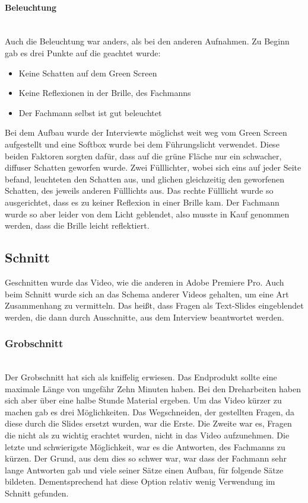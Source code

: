 \paragraph{Beleuchtung}
\leavevmode \\
Auch die Beleuchtung war anders, als bei den anderen Aufnahmen. Zu Beginn gab es drei Punkte auf die geachtet wurde:
\begin{itemize}
\item Keine Schatten auf dem Green Screen
\item Keine Reflexionen in der Brille, des Fachmanns
\item Der Fachmann selbst ist gut beleuchtet 
\end{itemize}
Bei dem Aufbau wurde der Interviewte möglichst weit weg vom Green Screen aufgestellt und eine Softbox wurde bei dem Führungslicht verwendet. Diese beiden Faktoren sorgten dafür, dass auf die grüne Fläche nur ein schwacher, diffuser Schatten geworfen wurde. Zwei Fülllichter, wobei sich eins auf jeder Seite befand, leuchteten den Schatten aus, und glichen gleichzeitig den geworfenen Schatten, des jeweils anderen Fülllichts aus. Das rechte Fülllicht wurde so ausgerichtet, dass es zu keiner Reflexion in einer Brille kam. Der Fachmann wurde so aber leider von dem Licht geblendet, also musste in Kauf genommen werden, dass die Brille leicht reflektiert.

\subsection{Schnitt}
Geschnitten wurde das Video, wie die anderen in Adobe Premiere Pro. Auch beim Schnitt wurde sich an das Schema anderer Videos gehalten, um eine Art Zusammenhang zu vermitteln. Das heißt, dass Fragen als Text-Slides eingeblendet werden, die dann durch Ausschnitte, aus dem Interview beantwortet werden.
\subsubsection{Grobschnitt}
\leavevmode \\
Der Grobschnitt hat sich als kniffelig erwiesen. Das Endprodukt sollte eine maximale Länge von ungefähr Zehn Minuten haben. Bei den Dreharbeiten haben sich aber über eine halbe Stunde Material ergeben. Um das Video kürzer zu machen gab es drei Möglichkeiten. Das Wegschneiden, der gestellten Fragen, da diese durch die Slides ersetzt wurden, war die Erste. Die Zweite war es, Fragen die nicht als zu wichtig erachtet wurden, nicht in das Video aufzunehmen. Die letzte und schwierigste Möglichkeit, war es die Antworten, des Fachmanns zu kürzen. Der Grund, aus dem dies so schwer war, war dass der Fachmann sehr lange Antworten gab und viele seiner Sätze einen Aufbau, für folgende Sätze bildeten. Dementsprechend hat diese Option relativ wenig Verwendung im Schnitt gefunden.
